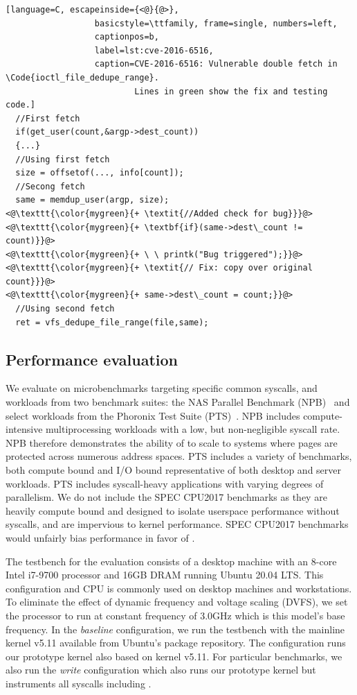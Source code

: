 \documentclass[letterpaper,twocolumn,10pt]{article}
\begin{document}
\begin{minipage}{\linewidth}
\begin{lstlisting}[language=C, escapeinside={<@}{@>}, 
                  basicstyle=\ttfamily, frame=single, numbers=left, 
                  captionpos=b,
                  label=lst:cve-2016-6516,
                  caption=CVE-2016-6516: Vulnerable double fetch in \Code{ioctl_file_dedupe_range}. 
                          Lines in green show the fix and testing code.]
  //First fetch
  if(get_user(count,&argp->dest_count)) 
  {...}
  //Using first fetch
  size = offsetof(..., info[count]);
  //Secong fetch
  same = memdup_user(argp, size);
<@\texttt{\color{mygreen}{+ \textit{//Added check for bug}}}@>
<@\texttt{\color{mygreen}{+ \textbf{if}(same->dest\_count != count)}}@>
<@\texttt{\color{mygreen}{+ \ \ printk("Bug triggered");}}@>
<@\texttt{\color{mygreen}{+ \textit{// Fix: copy over original count}}}@>
<@\texttt{\color{mygreen}{+ same->dest\_count = count;}}@>
  //Using second fetch
  ret = vfs_dedupe_file_range(file,same);
\end{lstlisting}
\end{minipage}


\subsection{Performance evaluation}

We evaluate \tiktok on microbenchmarks targeting specific 
common syscalls, and workloads from two benchmark suites: the 
NAS Parallel Benchmark (NPB)~\cite{npb} and select workloads 
from the Phoronix Test Suite (PTS)~\cite{pts}. 
NPB includes compute-intensive multiprocessing workloads with a 
low, but non-negligible syscall rate. 
NPB therefore demonstrates the ability of \tiktok to 
scale to systems where pages are protected across numerous 
address spaces.
PTS includes a variety of benchmarks, both compute bound and 
I/O bound representative of both desktop and server workloads.
PTS includes syscall-heavy applications with varying degrees 
of parallelism.
We do not include the SPEC CPU2017 benchmarks
as they are heavily compute bound and designed to isolate userspace 
performance without syscalls, and are impervious to kernel performance.
SPEC CPU2017 benchmarks would unfairly bias performance in favor of
\tiktok.

The testbench for the evaluation consists of a desktop machine 
with an 8-core Intel i7-9700 processor and 16GB DRAM running 
Ubuntu 20.04 LTS. This configuration and CPU is commonly used on desktop
machines and workstations.
%
To eliminate the effect of dynamic frequency and voltage 
scaling (DVFS), we set the processor to run at constant 
frequency of 3.0GHz which is this model's base frequency.
In the \emph{baseline} configuration, we run the testbench 
with the mainline kernel v5.11 available from Ubuntu's package 
repository.
The \emph{\tiktok} configuration runs our prototype \tiktok kernel 
also based on kernel v5.11.
For particular benchmarks, we also run the \emph{\tiktok{+}write}
configuration which also runs our prototype \tiktok kernel
but instruments all syscalls including .
\end{document}
